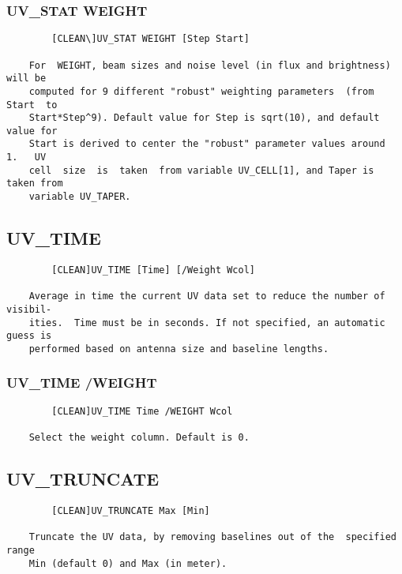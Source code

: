 \subsubsection{UV\_STAT WEIGHT}
\begin{verbatim}
        [CLEAN\]UV_STAT WEIGHT [Step Start]

    For  WEIGHT, beam sizes and noise level (in flux and brightness) will be
    computed for 9 different "robust" weighting parameters  (from  Start  to
    Start*Step^9). Default value for Step is sqrt(10), and default value for
    Start is derived to center the "robust" parameter values around  1.   UV
    cell  size  is  taken  from variable UV_CELL[1], and Taper is taken from
    variable UV_TAPER.

\end{verbatim}
\subsection{UV\_TIME}
\begin{verbatim}
        [CLEAN]UV_TIME [Time] [/Weight Wcol]

    Average in time the current UV data set to reduce the number of visibil-
    ities.  Time must be in seconds. If not specified, an automatic guess is
    performed based on antenna size and baseline lengths.

\end{verbatim}
\subsubsection{UV\_TIME /WEIGHT}
\begin{verbatim}
        [CLEAN]UV_TIME Time /WEIGHT Wcol

    Select the weight column. Default is 0.

\end{verbatim}
\subsection{UV\_TRUNCATE}
\begin{verbatim}
        [CLEAN]UV_TRUNCATE Max [Min]

    Truncate the UV data, by removing baselines out of the  specified  range
    Min (default 0) and Max (in meter).

\end{verbatim}
